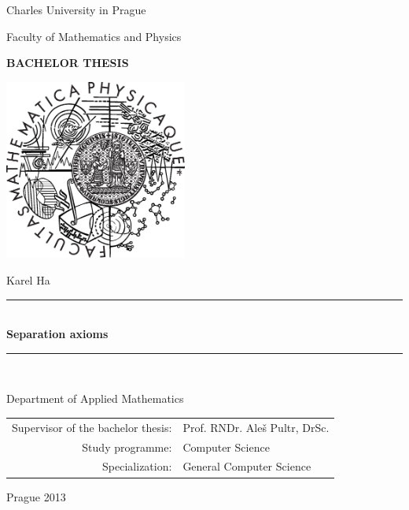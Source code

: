 \documentclass[12pt,a4paper]{report}
\newcommand{\HRule}{\rule{\linewidth}{0.5mm}}
\theoremstyle{plain}
\theoremstyle{definition}
\theoremstyle{remark}
\numberwithin{equation}{section}
\begin{document}


\pagestyle{empty}
\begin{center}

\large

Charles University in Prague

\medskip

Faculty of Mathematics and Physics

\vfill

{\bf\Large BACHELOR THESIS}

\vfill

\centerline{\mbox{\includegraphics[width=60mm]{../img/logo.eps}}}

\vfill
\vspace{5mm}

{\LARGE Karel Ha}

\vspace{15mm}

\HRule \\[0.6cm]
{\LARGE\bfseries Separation axioms} \\[0.2cm]
\HRule \\[1.5cm]

\vfill

Department of Applied Mathematics

\vfill

\begin{tabular}{rl}

Supervisor of the bachelor thesis: & Prof. RNDr. Aleš Pultr, DrSc. \\
\noalign{\vspace{2mm}}
Study programme: & Computer Science \\
\noalign{\vspace{2mm}}
Specialization: & General Computer Science \\
\end{tabular}

\vfill

Prague 2013

\end{center}
\end{document}
